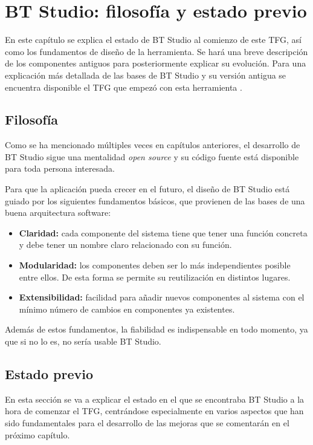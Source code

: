 \chapter{BT Studio: filosofía y estado previo}\label{cap:bt-studio}

En este capítulo se explica el estado de BT Studio al comienzo de este TFG, así como los fundamentos de diseño de la herramienta. Se hará una breve descripción de los componentes antiguos para posteriormente explicar su evolución. Para una explicación más detallada de las bases de BT Studio y su versión antigua se encuentra disponible el TFG que empezó con esta herramienta \cite{TFG_BT_Studio}.

\section{Filosofía}

Como se ha mencionado múltiples veces en capítulos anteriores, el desarrollo de BT Studio sigue una mentalidad \textit{open source} y su código fuente está disponible para toda persona interesada.

Para que la aplicación pueda crecer en el futuro, el diseño de BT Studio está guiado por los siguientes fundamentos básicos, que provienen de las bases de una buena arquitectura software:

\begin{itemize}
    \item \textbf{Claridad:} cada componente del sistema tiene que tener una función concreta y debe tener un nombre claro relacionado con su función.
    \item \textbf{Modularidad:} los componentes deben ser lo más independientes posible entre ellos. De esta forma se permite su reutilización en distintos lugares.
    \item \textbf{Extensibilidad:} facilidad para añadir nuevos componentes al sistema con el mínimo número de cambios en componentes ya existentes. 
\end{itemize}

Además de estos fundamentos, la fiabilidad es indispensable en todo momento, ya que si no lo es, no sería usable BT Studio.

\section{Estado previo}

En esta sección se va a explicar el estado en el que se encontraba BT Studio a la hora de comenzar el TFG, centrándose especialmente en varios aspectos que han sido fundamentales para el desarrollo de las mejoras que se comentarán en el próximo capítulo.

